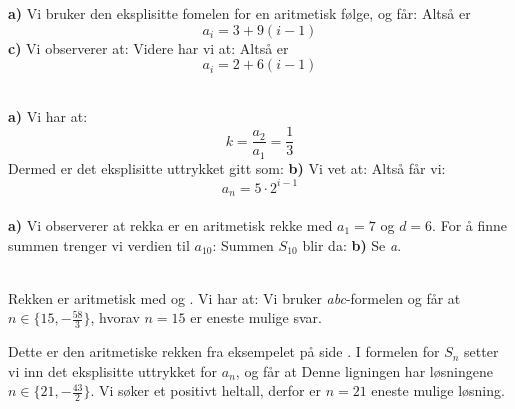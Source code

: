 




\textbf{a)}
Vi bruker den eksplisitte fomelen for en aritmetisk følge, og får:
Altså er
\[ a_i=3+9(i-1) \]
\textbf{c)}
Vi observerer at:
Videre har vi at:\vs
{}
Altså er
\[ a_i=2+6(i-1) \]

\\
\textbf{a)}
Vi har at:
\[ k=\frac{a_2}{a_1}= \frac{1}{3}\]
Dermed er det eksplisitte uttrykket gitt som:
\textbf{b)}
Vi vet at:
Altså får vi:
\[ a_n = 5\cdot2^{i-1} \]
\newpage
{}\\
\textbf{a)} Vi observerer at rekka er en aritmetisk rekke med $ a_1= 7$ og $ d= 6$. For å finne summen trenger vi verdien til $ a_{10} $:
Summen $ S_{10} $ blir da:
\textbf{b)} Se \textsl{a}.

 \\
Rekken er aritmetisk med  og . Vi har at:
Vi bruker \textit{abc}-formelen og får at $ {n\in\lbrace15, -\frac{58}{3}\rbrace} $, hvorav $ {n=15} $ er eneste mulige svar. 

Dette er den aritmetiske rekken fra eksempelet på side \pageref{arrekeks}. I formelen for $ S_n $ setter vi inn det eksplisitte uttrykket for $ a_n $, og får at	
Denne ligningen har løsningene $ {n\in \big\lbrace21, -\frac{43}{2} \big\rbrace}$. Vi søker et positivt heltall, derfor er $ {n=21} $ eneste mulige løsning.

